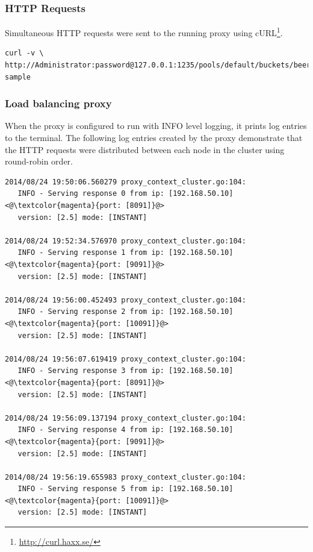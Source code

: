 \documentclass[a4paper,11pt,twoside]{report}
\begin{document}
\subsubsection*{HTTP Requests} 
Simultaneous HTTP requests were sent to the running proxy using cURL\footnote{\label{curl_link} \url{http://curl.haxx.se/}}. \smallskip
\begin{lstlisting}[language=terminal]
curl -v \ 
http://Administrator:password@127.0.0.1:1235/pools/default/buckets/beer-sample
\end{lstlisting}


\subsubsection*{Load balancing proxy} 
When the proxy is configured to run with INFO level logging, it prints log entries to the terminal. The following log entries created by the proxy demonstrate that the HTTP requests were distributed between each node in the cluster using round-robin order.\smallskip


\begin{lstlisting}[language=terminal]
2014/08/24 19:50:06.560279 proxy_context_cluster.go:104:     
   INFO - Serving response 0 from ip: [192.168.50.10] <@\textcolor{magenta}{port: [8091]}@> 
   version: [2.5] mode: [INSTANT]

2014/08/24 19:52:34.576970 proxy_context_cluster.go:104:     
   INFO - Serving response 1 from ip: [192.168.50.10] <@\textcolor{magenta}{port: [9091]}@> 
   version: [2.5] mode: [INSTANT]

2014/08/24 19:56:00.452493 proxy_context_cluster.go:104:     
   INFO - Serving response 2 from ip: [192.168.50.10] <@\textcolor{magenta}{port: [10091]}@> 
   version: [2.5] mode: [INSTANT]

2014/08/24 19:56:07.619419 proxy_context_cluster.go:104:     
   INFO - Serving response 3 from ip: [192.168.50.10] <@\textcolor{magenta}{port: [8091]}@> 
   version: [2.5] mode: [INSTANT]

2014/08/24 19:56:09.137194 proxy_context_cluster.go:104:     
   INFO - Serving response 4 from ip: [192.168.50.10] <@\textcolor{magenta}{port: [9091]}@> 
   version: [2.5] mode: [INSTANT]

2014/08/24 19:56:19.655983 proxy_context_cluster.go:104:     
   INFO - Serving response 5 from ip: [192.168.50.10] <@\textcolor{magenta}{port: [10091]}@> 
   version: [2.5] mode: [INSTANT]
\end{lstlisting}
\end{document}
